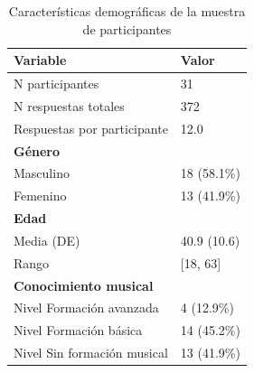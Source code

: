 \begin{table}[htbp]
\centering
\caption{Características demográficas de la muestra de participantes}
\label{tab:demographics}
\begin{tabular}{ll}
\toprule
\textbf{Variable} & \textbf{Valor} \\
\midrule
N participantes & 31 \\
N respuestas totales & 372 \\
Respuestas por participante & 12.0 \\
\midrule
\textbf{Género} & \\
  Masculino & 18 (58.1\%) \\
  Femenino & 13 (41.9\%) \\
\midrule
\textbf{Edad} & \\
  Media (DE) & 40.9 (10.6) \\
  Rango & [18, 63] \\
\midrule
\textbf{Conocimiento musical} & \\
  Nivel Formación avanzada & 4 (12.9\%) \\
  Nivel Formación básica & 14 (45.2\%) \\
  Nivel Sin formación musical & 13 (41.9\%) \\
\bottomrule
\end{tabular}
\end{table}
